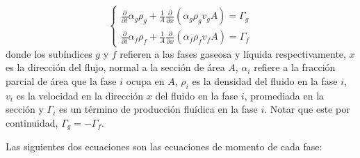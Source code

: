\begin{equation}
\left \{
\begin{array}{r}
\frac{\partial} {\partial t} \alpha_g \rho_g + \frac{1}{A} \frac{\partial}{\partial x} \left (\alpha_g \rho_g v_g A \right ) = \Gamma_g \\
\frac{\partial} {\partial t} \alpha_f \rho_f + \frac{1}{A} \frac{\partial}{\partial x} \left (\alpha_f \rho_f v_f A \right ) = \Gamma_f
\end{array}
\right .
\label{relap-masa}
\end{equation}
donde los subíndices $g$ y $f$ refieren a las fases gaseosa y líquida respectivamente,
$x$ es la dirección del flujo, normal a la sección de área $A$,
$\alpha_i$ refiere a la fracción parcial de área que la fase $i$ ocupa en $A$,
$\rho_i$ es la densidad del fluido en la fase $i$,
$v_i$ es la velocidad en la dirección $x$ del fluido en la fase $i$, promediada en la sección y
$\Gamma_i$ es un término de producción fluídica en la fase $i$.
Notar que este por continuidad, $\Gamma_g = -\Gamma_f$.

Las siguientes dos ecuaciones son las ecuaciones de momento de cada fase:

